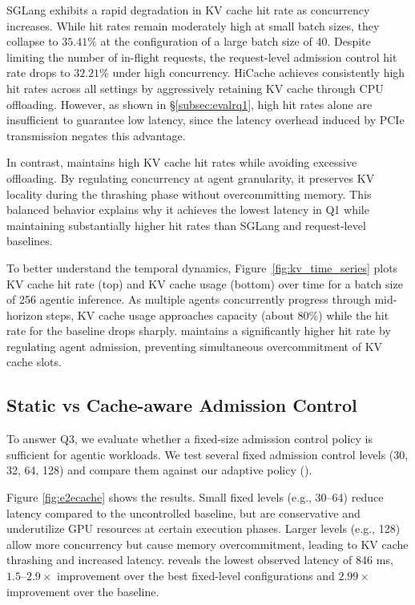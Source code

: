 SGLang exhibits a rapid degradation in KV cache hit rate as concurrency increases.
While hit rates remain moderately high at small batch sizes, they collapse to $35.41\%$ at the configuration of a large batch size of 40. Despite limiting the number of in-flight requests, the request-level admission control hit rate drops to $32.21\%$ under high concurrency. HiCache achieves consistently high hit rates across all settings by aggressively retaining KV cache through CPU offloading. However, as shown in \S\ref{subsec:evalrq1}, high hit rates alone are insufficient to guarantee low latency, since the latency overhead induced by PCIe transmission negates this advantage. 

In contrast, \SysName maintains high KV cache hit rates while avoiding excessive offloading.
By regulating concurrency at agent granularity, it preserves KV locality during the thrashing phase without overcommitting memory.
This balanced behavior explains why it achieves the lowest latency in Q1 while maintaining substantially higher hit rates than SGLang and request-level baselines.


To better understand the temporal dynamics, Figure~\ref{fig:kv_time_series} plots KV cache hit rate (top) and KV cache usage (bottom) over time for a batch size of 256 agentic inference. As multiple agents concurrently progress through mid-horizon steps, KV cache usage approaches capacity (about 80\%) while the hit rate for the baseline drops sharply. \SysName maintains a significantly higher hit rate by regulating agent admission, preventing simultaneous overcommitment of KV cache slots.

\subsection{Static vs Cache-aware Admission Control}
\label{subsec:evalrq3}
To answer Q3, we evaluate whether a fixed-size admission control policy is sufficient for agentic workloads. We test several fixed admission control levels (30, 32, 64, 128) and compare them against our adaptive policy (\SysName).

Figure \ref{fig:e2ecache} shows the results. Small fixed levels (e.g., 30–64) reduce latency compared to the uncontrolled baseline, but are conservative and underutilize GPU resources at certain execution phases. Larger levels (e.g., 128) allow more concurrency but cause memory overcommitment, leading to KV cache thrashing and increased latency. \SysName reveals the lowest observed latency of 846 ms, $1.5–2.9\times$ improvement over the best fixed-level configurations and $2.99\times$ improvement over the baseline.

